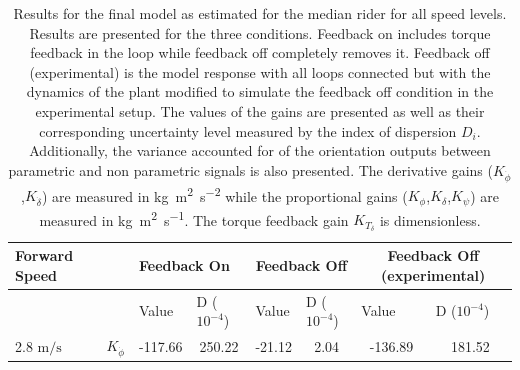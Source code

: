 \begin{table}[]
    \caption{ Results for the final  model as estimated for the median rider for all speed levels. Results are presented for the three conditions. Feedback on includes torque feedback in the loop while feedback off completely removes it. Feedback off (experimental) is the model response with all loops connected but with the dynamics of the plant modified to simulate the feedback off condition in the experimental setup. The values of the gains are presented as well as their corresponding uncertainty level measured by the index of dispersion \ensuremath{D_i}. Additionally, the variance accounted for of the orientation outputs between parametric and non parametric signals is also presented. The derivative gains (\ensuremath{K_{\dot{\phi}}},\ensuremath{K_{\dot{\delta}}}) are measured in \si{\kilogram\square\meter\per\square\second} while the proportional gains (\ensuremath{K_{\phi}},\ensuremath{K_{\delta}},\ensuremath{K_{\psi}}) are measured in \si{\kilogram\square\meter\per\second}. The torque feedback gain \ensuremath{K_{T_\delta}} is dimensionless.}
    \begin{tabular}{llcccccc}
    \hline
    Forward Speed                &                       & \multicolumn{2}{l}{Feedback On}                                                                 & \multicolumn{2}{c}{Feedback Off}                                                                & \multicolumn{2}{c}{Feedback Off (experimental)}                                                 \\ \hline
                                    &                       & \multicolumn{1}{l}{\multirow{2}{*}{Value}} & \multicolumn{1}{l}{\multirow{2}{*}{D ($10^{-4}$)}} & \multicolumn{1}{l}{\multirow{2}{*}{Value}} & \multicolumn{1}{l}{\multirow{2}{*}{D ($10^{-4}$)}} & \multicolumn{1}{l}{\multirow{2}{*}{Value}} & \multicolumn{1}{l}{\multirow{2}{*}{D ($10^{-4}$)}} \\
                                    &                       & \multicolumn{1}{l}{}                       & \multicolumn{1}{l}{}                               & \multicolumn{1}{l}{}                       & \multicolumn{1}{l}{}                               & \multicolumn{1}{l}{}                       & \multicolumn{1}{l}{}                               \\ \cline{3-8} 
    2.8 $\si{\meter\per\second}$ & $K_{\dot{\phi}} $     & -117.66                                    & 250.22                                             & -21.12                                     & 2.04                                               & -136.89                                    & 181.52                                             \\

\end{tabular}
\end{table}
